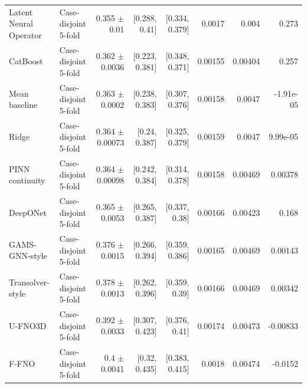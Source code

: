 \begin{landscape}
\begin{longtable}{p{3.8cm}p{2.9cm}rrrrrr}
Latent Neural Operator & Case-disjoint 5-fold & 0.355 $\pm$ 0.01 & [0.288, 0.41] & [0.334, 0.379] & 0.0017 & 0.004 & 0.273 \\
CatBoost & Case-disjoint 5-fold & 0.362 $\pm$ 0.0036 & [0.223, 0.381] & [0.348, 0.371] & 0.00155 & 0.00404 & 0.257 \\
Mean baseline & Case-disjoint 5-fold & 0.363 $\pm$ 0.0002 & [0.238, 0.383] & [0.307, 0.376] & 0.00158 & 0.0047 & -1.91e-05 \\
Ridge & Case-disjoint 5-fold & 0.364 $\pm$ 0.00073 & [0.24, 0.387] & [0.325, 0.379] & 0.00159 & 0.0047 & 9.99e-05 \\
PINN continuity & Case-disjoint 5-fold & 0.364 $\pm$ 0.00098 & [0.242, 0.384] & [0.314, 0.378] & 0.00158 & 0.00469 & 0.00378 \\
DeepONet & Case-disjoint 5-fold & 0.365 $\pm$ 0.0053 & [0.265, 0.387] & [0.337, 0.38] & 0.00166 & 0.00423 & 0.168 \\
GAMS-GNN-style & Case-disjoint 5-fold & 0.376 $\pm$ 0.0015 & [0.266, 0.394] & [0.359, 0.386] & 0.00165 & 0.00469 & 0.00143 \\
Transolver-style & Case-disjoint 5-fold & 0.378 $\pm$ 0.0013 & [0.262, 0.396] & [0.359, 0.39] & 0.00166 & 0.00469 & 0.00342 \\
U-FNO3D & Case-disjoint 5-fold & 0.392 $\pm$ 0.0033 & [0.307, 0.423] & [0.376, 0.41] & 0.00174 & 0.00473 & -0.00833 \\
F-FNO & Case-disjoint 5-fold & 0.4 $\pm$ 0.0041 & [0.32, 0.435] & [0.383, 0.415] & 0.0018 & 0.00474 & -0.0152 \\
\bottomrule\end{longtable}\end{landscape}


